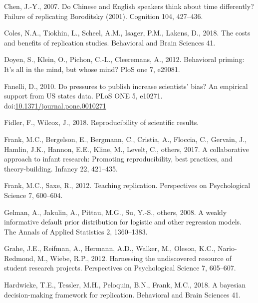 \documentclass[]{elsarticle} %
\newlength{\cslhangindent}
\newlength{\cslentryspacingunit} %
\newenvironment{CSLReferences}[2] %
 {%
  \setlength{\parindent}{0pt}
  \ifodd #1
  \let\oldpar\par
  \def\par{\hangindent=\cslhangindent\oldpar}
  \fi
  \setlength{\parskip}{#2\cslentryspacingunit}
 }%
 {}
\begin{document}
\begin{CSLReferences}{1}{0}
\leavevmode{}%
Chen, J.-Y., 2007. Do {Chinese} and {English} speakers think about time differently? {Failure} of replicating {Boroditsky} (2001). Cognition 104, 427--436.

\leavevmode{}%
Coles, N.A., Tiokhin, L., Scheel, A.M., Isager, P.M., Lakens, D., 2018. The costs and benefits of replication studies. Behavioral and Brain Sciences 41.

\leavevmode{}%
Doyen, S., Klein, O., Pichon, C.-L., Cleeremans, A., 2012. Behavioral priming: It's all in the mind, but whose mind? PloS one 7, e29081.

\leavevmode{}%
Fanelli, D., 2010. Do pressures to publish increase scientists' bias? An empirical support from US states data. PLoS ONE 5, e10271. doi:\href{https://doi.org/10.1371/journal.pone.0010271}{10.1371/journal.pone.0010271}

\leavevmode{}%
Fidler, F., Wilcox, J., 2018. Reproducibility of scientific results.

\leavevmode{}%
Frank, M.C., Bergelson, E., Bergmann, C., Cristia, A., Floccia, C., Gervain, J., Hamlin, J.K., Hannon, E.E., Kline, M., Levelt, C., others, 2017. A collaborative approach to infant research: Promoting reproducibility, best practices, and theory-building. Infancy 22, 421--435.

\leavevmode{}%
Frank, M.C., Saxe, R., 2012. Teaching replication. Perspectives on Psychological Science 7, 600--604.

\leavevmode{}%
Gelman, A., Jakulin, A., Pittau, M.G., Su, Y.-S., others, 2008. A weakly informative default prior distribution for logistic and other regression models. The Annals of Applied Statistics 2, 1360--1383.

\leavevmode{}%
Grahe, J.E., Reifman, A., Hermann, A.D., Walker, M., Oleson, K.C., Nario-Redmond, M., Wiebe, R.P., 2012. Harnessing the undiscovered resource of student research projects. Perspectives on Psychological Science 7, 605--607.

\leavevmode{}%
Hardwicke, T.E., Tessler, M.H., Peloquin, B.N., Frank, M.C., 2018. A bayesian decision-making framework for replication. Behavioral and Brain Sciences 41.


\end{CSLReferences}
\end{document}
